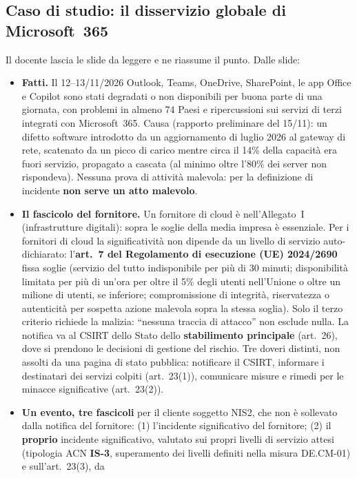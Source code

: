 \subsection{Caso di studio: il disservizio globale di Microsoft~365}
Il docente lascia le slide da leggere e ne riassume il punto. Dalle slide:
\begin{itemize}
  \item \textbf{Fatti.} Il 12--13/11/2026 Outlook, Teams, OneDrive, SharePoint, le app Office e
    Copilot sono stati degradati o non disponibili per buona parte di una giornata, con problemi in
    almeno 74 Paesi e ripercussioni sui servizi di terzi integrati con Microsoft~365. Causa (rapporto
    preliminare del 15/11): un difetto software introdotto da un aggiornamento di luglio 2026 al
    gateway di rete, scatenato da un picco di carico mentre circa il 14\% della capacità era fuori
    servizio, propagato a cascata (al minimo oltre l'80\% dei server non rispondeva). Nessuna prova di
    attività malevola: per la definizione di incidente \textbf{non serve un atto malevolo}.
  \item \textbf{Il fascicolo del fornitore.} Un fornitore di cloud è nell'Allegato~I (infrastrutture
    digitali): sopra le soglie della media impresa è essenziale. Per i fornitori di cloud la
    significatività non dipende da un livello di servizio auto-dichiarato: l'\textbf{art.~7 del
    Regolamento di esecuzione (UE) 2024/2690} fissa soglie (servizio del tutto indisponibile per più
    di 30 minuti; disponibilità limitata per più di un'ora per oltre il 5\% degli utenti nell'Unione o
    oltre un milione di utenti, se inferiore; compromissione di integrità, riservatezza o autenticità
    per sospetta azione malevola sopra la stessa soglia). Solo il terzo criterio richiede la malizia:
    ``nessuna traccia di attacco'' non esclude nulla. La notifica va al CSIRT dello Stato dello
    \textbf{stabilimento principale} (art.~26), dove si prendono le decisioni di gestione del rischio.
    Tre doveri distinti, non assolti da una pagina di stato pubblica: notificare il CSIRT, informare i
    destinatari dei servizi colpiti (art.~23(1)), comunicare misure e rimedi per le minacce
    significative (art.~23(2)).
  \item \textbf{Un evento, tre fascicoli} per il cliente soggetto NIS2, che non è sollevato dalla
    notifica del fornitore: (1) l'incidente significativo del fornitore; (2) il \textbf{proprio}
    incidente significativo, valutato sui propri livelli di servizio attesi (tipologia ACN
    \textbf{IS-3}, superamento dei livelli definiti nella misura DE.CM-01) e sull'art.~23(3), da

\end{itemize}
